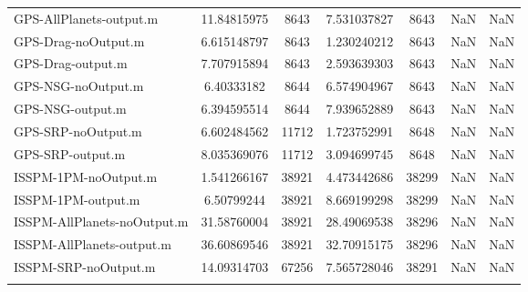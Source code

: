 \begin{table}[htbp!]
\begin{tabular}{lcccccc}
         GPS-AllPlanets-output.m & 11.84815975 & 8643 & 7.531037827 & 8643 & NaN & NaN \\
         GPS-Drag-noOutput.m & 6.615148797 & 8643 & 1.230240212 & 8643 & NaN & NaN \\
         GPS-Drag-output.m & 7.707915894 & 8643 & 2.593639303 & 8643 & NaN & NaN \\
         GPS-NSG-noOutput.m & 6.40333182 & 8644 & 6.574904967 & 8643 & NaN & NaN \\
         GPS-NSG-output.m & 6.394595514 & 8644 & 7.939652889 & 8643 & NaN & NaN \\
         GPS-SRP-noOutput.m & 6.602484562 & 11712 & 1.723752991 & 8648 & NaN & NaN \\
         GPS-SRP-output.m & 8.035369076 & 11712 & 3.094699745 & 8648 & NaN & NaN \\
         ISSPM-1PM-noOutput.m & 1.541266167 & 38921 & 4.473442686 & 38299 & NaN & NaN \\
         ISSPM-1PM-output.m & 6.50799244 & 38921 & 8.669199298 & 38299 & NaN & NaN \\
         ISSPM-AllPlanets-noOutput.m & 31.58760004 & 38921 & 28.49069538 & 38296 & NaN & NaN \\
         ISSPM-AllPlanets-output.m & 36.60869546 & 38921 & 32.70915175 & 38296 & NaN & NaN \\
         ISSPM-SRP-noOutput.m & 14.09314703 & 67256 & 7.565728046 & 38291 & NaN & NaN \\
      \hline\hline
      \label{Table: Performance1} 
\end{tabular}
\end{table}
